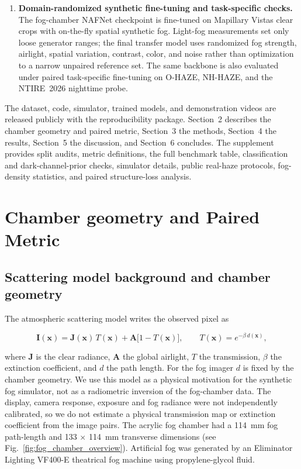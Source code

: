\documentclass{optica-article}
\begin{document}
\begin{enumerate}
\item \textbf{Domain-randomized synthetic fine-tuning and
task-specific checks.} The fog-chamber NAFNet checkpoint is
fine-tuned on Mapillary Vistas clear crops with on-the-fly spatial
synthetic fog. Light-fog measurements set only loose generator
ranges; the final transfer model uses randomized fog strength,
airlight, spatial variation, contrast, color, and noise rather than
optimization to a narrow unpaired reference set. The same backbone
is also evaluated under paired task-specific fine-tuning on O-HAZE,
NH-HAZE, and the NTIRE~2026 nighttime probe.

\end{enumerate}
 
The dataset, code, simulator, trained models, and demonstration videos are released
publicly with the reproducibility package. Section~2 describes the chamber geometry and paired metric,
Section~3 the methods, Section~4 the results, Section~5 the
discussion, and Section~6 concludes. The supplement provides split audits, metric definitions, the full benchmark table, classification and dark-channel-prior checks, simulator details, public real-haze protocols, fog-density statistics, and paired structure-loss analysis.

\section{Chamber geometry and Paired Metric}
\label{sec:fogphysics}
 
\subsection{Scattering model background and chamber geometry}
 
The atmospheric scattering model \cite{narasimhan2002vision} writes
the observed pixel as
 
\begin{equation}
  \mathbf{I}(\mathbf{x}) =
    \mathbf{J}(\mathbf{x})\,T(\mathbf{x})
    + \mathbf{A}\bigl[1 - T(\mathbf{x})\bigr],
  \qquad
  T(\mathbf{x}) = e^{-\beta\, d(\mathbf{x})},
  \label{eq:scattering}
\end{equation}
 
\noindent where $\mathbf{J}$ is the clear radiance, $\mathbf{A}$ the
global airlight, $T$ the transmission, $\beta$ the extinction
coefficient, and $d$ the path length. For the fog imager $d$ is
fixed by the chamber geometry. We use this model as a physical motivation for the synthetic fog simulator, not as a radiometric inversion of the fog-chamber data. The display, camera response, exposure and fog radiance were not independently calibrated, so we do not estimate a physical transmission map or extinction coefficient from the image pairs. The acrylic fog chamber had a 114~mm fog path-length and 133 $\times$ 114~mm transverse dimensions (see Fig.~\ref{fig:fog_chamber_overview}). Artificial
fog was generated by an Eliminator Lighting VF400-E theatrical fog
machine using propylene-glycol fluid.
 
\end{document}
